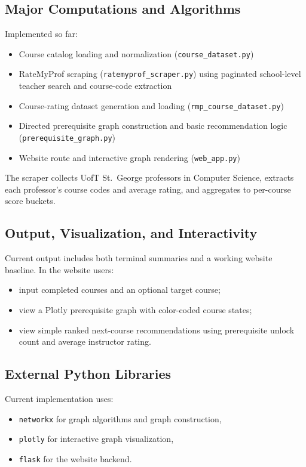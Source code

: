 \documentclass[12pt]{article}
\begin{document}
\subsection{Major Computations and Algorithms}
Implemented so far:
\begin{itemize}[leftmargin=*]
    \item Course catalog loading and normalization (\texttt{course\_dataset.py})
    \item RateMyProf scraping (\texttt{ratemyprof\_scraper.py}) using paginated school-level teacher search and course-code extraction
    \item Course-rating dataset generation and loading (\texttt{rmp\_course\_dataset.py})
    \item Directed prerequisite graph construction and basic recommendation logic (\texttt{prerequisite\_graph.py})
    \item Website route and interactive graph rendering (\texttt{web\_app.py})
\end{itemize}
The scraper collects UofT St.\ George professors in Computer Science, extracts each professor's course codes and average rating, and aggregates to per-course score buckets.

\subsection{Output, Visualization, and Interactivity}
Current output includes both terminal summaries and a working website baseline. In the website users:
\begin{itemize}[leftmargin=*]
    \item input completed courses and an optional target course;
    \item view a Plotly prerequisite graph with color-coded course states;
    \item view simple ranked next-course recommendations using prerequisite unlock count and average instructor rating.
\end{itemize}

\subsection{External Python Libraries}
Current implementation uses:
\begin{itemize}[leftmargin=*]
    \item \texttt{networkx} for graph algorithms and graph construction,
    \item \texttt{plotly} for interactive graph visualization,
    \item \texttt{flask} for the website backend.
\end{itemize}
\end{document}
